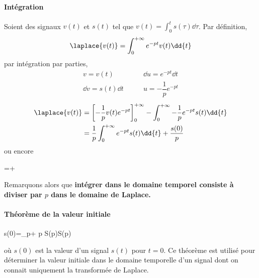\paragraph{Intégration}
Soient  des signaux $v(t)$ et $s(t)$ tel que 
$v(t)=\int_{0}^{t}s(\tau)\dd{\tau}$. Par définition,
\[
\laplace{v(t)}=\int_{0}^{+\infty} e^{-pt}v(t)\dd{t}
\]
par intégration par parties,
\begin{align*}
    v=v(t)\qquad&\dd{u}=e^{-pt}\dd{t}\\
    \dd{v}=s(t)\dd{t}\qquad&u=-\dfrac{1}{p}e^{-pt}
\end{align*} 
\begin{align*}
    \laplace{v(t)}&=\left[-\dfrac{1}{p}v(t)e^{-pt}\right]_0^{+\infty}
                          -\int_{0}^{+\infty}
                          -\dfrac{1}{p}e^{-pt}s(t)\dd{t} \\
    &=\dfrac{1}{p}\int_{0}^{+\infty} e^{-pt}s(t)\dd{t}+\dfrac{s(0)}{p}
\end{align*}
ou encore
\begin{bequation}
    =+
\end{bequation}
Remarquons alors que \textbf{intégrer dans le domaine temporel consiste à 
diviser par $p$ dans le domaine de Laplace.}
\paragraph{Théorème de la valeur initiale}
\begin{bequation}
    s(0)=\lim\limits_{p\rightarrow+\infty} p S(p)\qquad \forall S(p)
\end{bequation}
où $s(0)$ est la valeur d'un signal $s(t)$ pour $t=0$.
Ce théorème est utilisé pour déterminer la valeur initiale
dans le domaine temporelle d'un signal dont on connait 
uniquement la transformée de Laplace.
